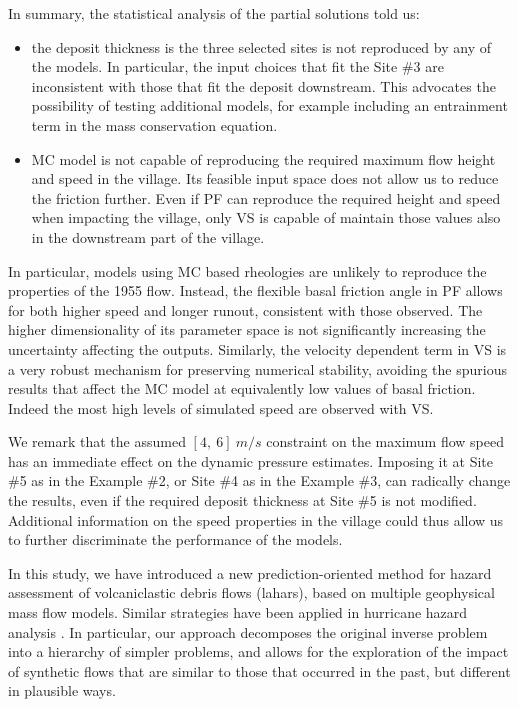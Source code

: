 \documentclass[nhess, manuscript]{copernicus}
\begin{document}
In summary, the statistical analysis of the partial solutions told us:
\begin{itemize}
  \item the deposit thickness is the three selected sites is not reproduced by any of the models. In particular, the input choices that fit the Site \#3 are inconsistent with those that fit the deposit downstream. This advocates the possibility of testing additional models, for example including an entrainment term in the mass conservation equation.
  \item MC model is not capable of reproducing the required maximum flow height and speed in the village. Its feasible input space does not allow us to reduce the friction further. Even if PF can reproduce the required height and speed when impacting the village, only VS is capable of maintain those values also in the downstream part of the village.
\end{itemize}

In particular, models using MC based rheologies are unlikely to reproduce the properties of the 1955 flow.  Instead, the flexible basal friction angle in PF allows for both higher speed and longer runout, consistent with those observed. The higher dimensionality of its parameter space is not significantly increasing the uncertainty affecting the outputs. Similarly, the velocity dependent term in VS is a very robust mechanism for preserving numerical stability, avoiding the spurious results that affect the MC model at equivalently low values of basal friction. Indeed the most high levels of simulated speed are observed with VS.

We remark that the assumed $[4,\ 6]\ m/s$ constraint on the maximum flow speed has an immediate effect on the dynamic pressure estimates. Imposing it at Site \#5 as in the Example \#2, or Site \#4 as in the Example \#3, can radically change the results, even if the required deposit thickness at Site \#5 is not modified. Additional information on the speed properties in the village could thus allow us to further discriminate the performance of the models.


\conclusions
In this study, we have introduced a new prediction-oriented method for hazard assessment of volcaniclastic debris flows (lahars), based on multiple geophysical mass flow models. Similar strategies have been applied in hurricane hazard analysis \citep{Krishna2016, Ghosh2018}. In particular, our approach  decomposes the original inverse problem into a hierarchy of simpler problems, and allows for the exploration of the impact of synthetic flows that are similar to those that occurred in the past, but different in plausible ways.
\end{document}
